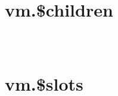 \begin{lstlisting}[language=JavaScript]

\end{lstlisting}




\begin{lstlisting}[language=JavaScript]

\end{lstlisting}




\begin{lstlisting}[language=JavaScript]

\end{lstlisting}



\section{vm.\$children}








\begin{lstlisting}[language=JavaScript]

\end{lstlisting}




\begin{lstlisting}[language=JavaScript]

\end{lstlisting}




\begin{lstlisting}[language=JavaScript]

\end{lstlisting}



\section{vm.\$slots}










\begin{lstlisting}[language=JavaScript]

\end{lstlisting}




\begin{lstlisting}[language=JavaScript]

\end{lstlisting}




